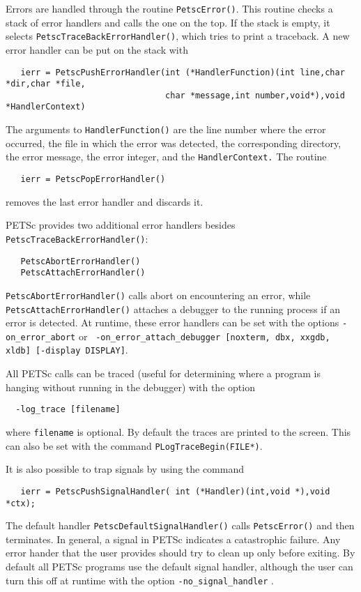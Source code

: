 Errors are handled through the routine {\tt PetscError()}. 
 This routine
checks a stack of error handlers and calls the one on the top.  
If the stack is empty, it selects {\tt PetscTraceBackErrorHandler()}, 
which  tries to print a traceback. 
A new error handler can be put on the stack with
\begin{verbatim}
   ierr = PetscPushErrorHandler(int (*HandlerFunction)(int line,char *dir,char *file,
                                char *message,int number,void*),void *HandlerContext)
\end{verbatim}
The arguments to {\tt HandlerFunction()} are the line number where 
the error occurred, the file in which the error was detected, the corresponding
directory, the error message, the error integer, and the {\tt HandlerContext.}
The routine 
\begin{verbatim} 
   ierr = PetscPopErrorHandler()
\end{verbatim}
removes the last error handler and discards it. 

PETSc provides two additional error handlers besides 
{\tt PetscTraceBackErrorHandler()}:
 
\begin{verbatim}
   PetscAbortErrorHandler()
   PetscAttachErrorHandler()
\end{verbatim}
{\tt PetscAbortErrorHandler()} calls abort on encountering an error, while
{\tt PetscAttachErrorHandler()} attaches a debugger to the running process
if an error is detected. At runtime, these error handlers can be set
with the options {\tt -on\_error\_abort} or {\tt
-on\_error\_attach\_debugger [noxterm, dbx, xxgdb, xldb] [-display DISPLAY]}.

All PETSc calls can be traced (useful for determining where a program is 
hanging without running in the debugger) with the option
\begin{verbatim}
  -log_trace [filename]
\end{verbatim}
where {\tt filename} is optional. By default the traces are printed to the 
screen.  This can also be set with the 
command {\tt PLogTraceBegin(FILE*)}.  


It is also possible to trap signals by using the 
command 
\begin{verbatim}
   ierr = PetscPushSignalHandler( int (*Handler)(int,void *),void *ctx);
\end{verbatim}
The default handler {\tt PetscDefaultSignalHandler()} 
calls  
{\tt PetscError()} and then terminates. In general, a signal in PETSc
indicates a catastrophic failure.  Any error hander that the user provides
should try to clean up only before exiting.  By default all PETSc programs
use the default signal handler, although the user can turn this off 
at runtime with the 
option {\tt -no\_signal\_handler} .

